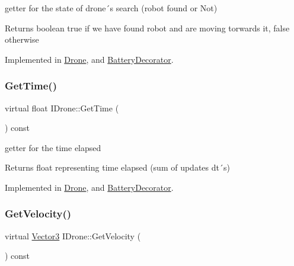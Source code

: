 getter for the state of drone´s search (robot found or Not) 

\begin{DoxyReturn}{Returns}
boolean true if we have found robot and are moving torwards it, false otherwise 
\end{DoxyReturn}


Implemented in \hyperlink{classDrone_a9bfe1ce0aea1215da3072434ed8e8527}{Drone}, and \hyperlink{classBatteryDecorator_aa0358ef7a9aee0f4942d32ad15ce4675}{Battery\+Decorator}.

\mbox{\label{classIDrone_a18809d1b0626ba66984ef3a91ffb644c}} 
\subsubsection{\texorpdfstring{Get\+Time()}{GetTime()}}
{\footnotesize\ttfamily virtual float I\+Drone\+::\+Get\+Time (\begin{DoxyParamCaption}{ }\end{DoxyParamCaption}) const\hspace{0.3cm}{\ttfamily [pure virtual]}}



getter for the time elapsed 

\begin{DoxyReturn}{Returns}
float representing time elapsed (sum of updates dt´s) 
\end{DoxyReturn}


Implemented in \hyperlink{classDrone_a0fde6a9a239da64ae102053c6404fe4d}{Drone}, and \hyperlink{classBatteryDecorator_a87cb6d468b6cd418775b4e01308fc0bf}{Battery\+Decorator}.

\mbox{\label{classIDrone_abad6c0adb60d6deceb13f30687fed57b}} 
\subsubsection{\texorpdfstring{Get\+Velocity()}{GetVelocity()}}
{\footnotesize\ttfamily virtual \hyperlink{classVector3}{Vector3} I\+Drone\+::\+Get\+Velocity (\begin{DoxyParamCaption}{ }\end{DoxyParamCaption}) const\hspace{0.3cm}{\ttfamily [pure virtual]}}



